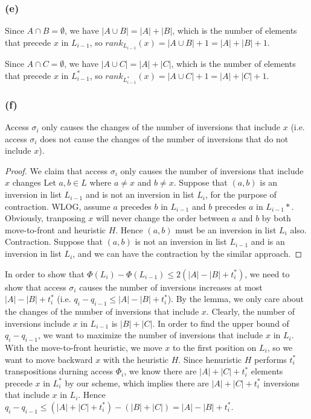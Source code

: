 \subsubsection*{(e)}

Since $A \cap B = \emptyset$, we have $|A \cup B| = |A| + |B|$,
which is the number of elements that precede $x$ in $L_{i-1}$,
so $rank_{L_{i-1}}(x) = |A \cup B| + 1 = |A| + |B| + 1$. 

Since $A \cap C = \emptyset$, we have $|A \cup C| = |A| + |C|$,
which is the number of elements that precede $x$ in $L_{i-1}^*$,
so $rank_{L_{i-1}^*}(x) = |A \cup C| + 1 = |A| + |C| + 1$. 

\subsubsection*{(f)}

\begin{lemma}
    Access $\sigma_i$ only causes the changes of 
    the number of inversions that include $x$ 
    (i.e. access $\sigma_i$ does not cause the changes of 
    the number of inversions that do not include $x$).
\end{lemma}

\begin{proof}
    We claim that access $\sigma_i$ only causes the number of inversions that include $x$ changes
    Let $a,b \in L$ where $a \neq x$ and $b \neq x$.
    Suppose that $(a,b)$ is an inversion in list $L_{i-1}$ and is not an inversion in list $L_i$,
    for the purpose of contraction.
    WLOG, assume $a$ precedes $b$ in $L_{i-1}$ and $b$ precedes $a$ in $L_{i-1}*$.
    Obviously, tranposing $x$ will never change the order between $a$ and $b$ 
    by both move-to-front and heuristic $H$.
    Hence $(a,b)$ must be an inversion in list $L_i$ also. Contraction.
    Suppose that $(a,b)$ is not an inversion in list $L_{i-1}$ and is an inversion in list $L_i$,
    and we can have the contraction by the similar approach.
\end{proof}

In order to show that $\Phi(L_i) - \Phi(L_{i-1}) \leq 2 (|A| - |B| + t_i^*)$,
we need to show that access $\sigma_i$ causes the number of inversions increases 
at most $|A| - |B| + t_i^*$ (i.e. $q_i - q_{i-1} \leq |A| - |B| + t_i^*$).
By the lemma, we only care about the changes of the number of inversions that include $x$.
Clearly, the number of inversions include $x$ in $L_{i-1}$ is $|B| + |C|$.
In order to find the upper bound of $q_i - q_{i-1}$,
we want to maximize the number of inversions that include $x$ in $L_i$.
With the move-to-front heuristic, we move $x$ to the first position on $L_i$,
so we want to move backward $x$ with the heuristic $H$.
Since henuristic $H$ performs $t_i^*$ transpositions durning access $\Phi_i$,
we know there are $|A| + |C| + t_i^*$ elements precede $x$ in $L_i^*$ by our scheme,
which implies there are $|A| + |C| + t_i^*$ inversions that include $x$ in $L_i$.
Hence $q_i - q_{i-1} \leq (|A| + |C| + t_i^*) - (|B| + |C|) = |A| - |B| + t_i^*$.

